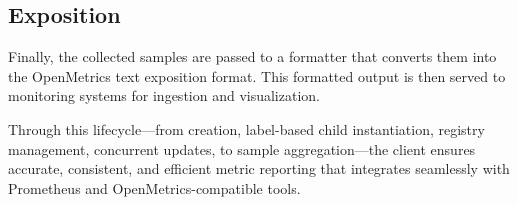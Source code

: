 \subsection{Exposition}

Finally, the collected samples are passed to a formatter that converts them into the OpenMetrics text exposition format. This formatted output is then served to monitoring systems for ingestion and visualization.

\bigskip

Through this lifecycle—from creation, label-based child instantiation, registry management, concurrent updates, to sample aggregation—the client ensures accurate, consistent, and efficient metric reporting that integrates seamlessly with Prometheus and OpenMetrics-compatible tools.
